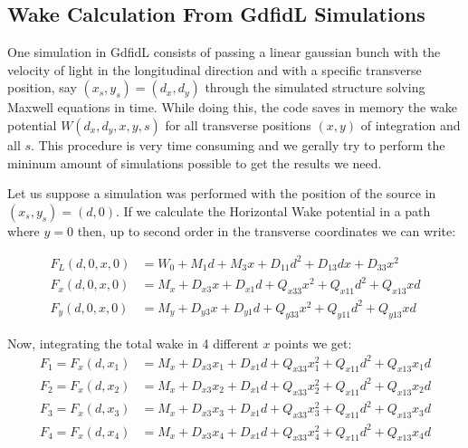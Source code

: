 \begin{apendicesenv}
\chapter{Wake Calculation From GdfidL Simulations} \label{app:wake_from_gdfidl}

    One simulation in GdfidL consists of passing a linear gaussian bunch with the velocity of light in the longitudinal direction and with a specific transverse position, say $(x_s,y_s)=(d_x,d_y)$ through the simulated structure solving Maxwell equations in time. While doing this, the code saves in memory the wake potential $W(d_x,d_y,x,y,s)$ for all transverse positions $(x,y)$ of integration and all $s$. This procedure is very time consuming and we gerally try to perform the mininum amount of simulations possible to get the results we need.

    Let us suppose a simulation was performed with the position of the source in $(x_s,y_s)=(d,0)$. If we calculate the Horizontal Wake potential in a path where $y=0$ then, up to second order in the transverse coordinates we can write:

    \begin{align}
		F_L(d,0,x,0) &= W_0  +  M_1d  +  M_3x + D_{11}d^2 + D_{13}dx + D_{33}x^2 \\
		F_x(d,0,x,0) &= M_x + D_{x3} x + D_{x1} d + Q_{x33} x^2 + Q_{x11} d^2 + Q_{x13} x d\\
		F_y(d,0,x,0) &= M_y + D_{y3} x + D_{y1} d + Q_{y33} x^2 + Q_{y11} d^2 + Q_{y13} x d
    \end{align}

    Now, integrating the total wake in 4 different $x$ points we get:
    \begin{align}
		F_1 = F_x(d,x_1) &= M_x  +  D_{x3} x_1  +  D_{x1} d  +  Q_{x33} x_1^2  +  Q_{x11} d^2  +  Q_{x13} x_1 d \\
    	F_2 = F_x(d,x_2) &= M_x  +  D_{x3} x_2  +  D_{x1} d  +  Q_{x33} x_2^2  +  Q_{x11} d^2  +  Q_{x13} x_2 d \\
    	F_3 = F_x(d,x_3) &= M_x  +  D_{x3} x_3  +  D_{x1} d  +  Q_{x33} x_3^2  +  Q_{x11} d^2  +  Q_{x13} x_3 d \\
    	F_4 = F_x(d,x_4) &= M_x  +  D_{x3} x_4  +  D_{x1} d  +  Q_{x33} x_4^2  +  Q_{x11} d^2  +  Q_{x13} x_4 d
    \end{align}


\end{apendicesenv}
